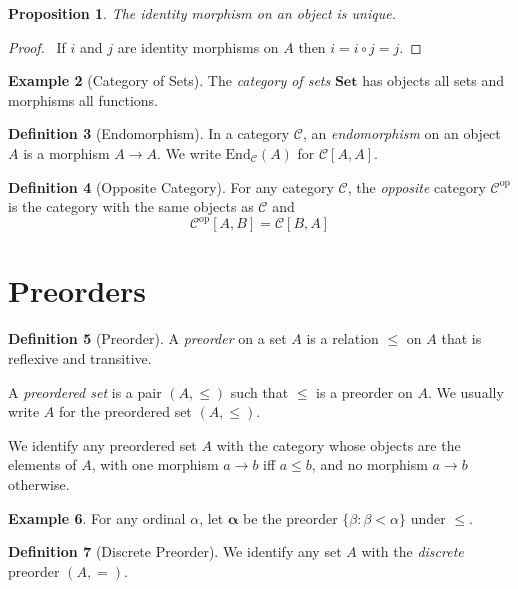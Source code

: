 \documentclass{book}
\let\qed\relax
\newtheorem{prop}{Proposition}[chapter]
\theoremstyle{definition}
\newtheorem{df}[prop]{Definition}
\newtheorem{ex}[prop]{Example}
\newcommand{\Set}{\ensuremath{\mathbf{Set}}}
\begin{document}
\begin{prop}
    \label{prop:id-morph-unique}
    The identity morphism on an object is unique.
\end{prop}

\begin{proof}
    \pf\ If $i$ and $j$ are identity morphisms on $A$ then $i = i \circ j = j$. \qed
\end{proof}

\begin{ex}[Category of Sets]
    The \emph{category of sets} $\Set$ has objects all sets and morphisms all functions.
\end{ex}

\begin{df}[Endomorphism]
    In a category $\mathcal{C}$, an \emph{endomorphism} on an object $A$ is a morphism $A \rightarrow A$. We write $\mathrm{End}_\mathcal{C}(A)$ for $\mathcal{C}[A,A]$.
\end{df}

\begin{df}[Opposite Category]
    For any category $\mathcal{C}$, the \emph{opposite} category $\mathcal{C}^\mathrm{op}$ is the category with the same objects as $\mathcal{C}$ and
    \[ \mathcal{C}^\mathrm{op}[A,B] = \mathcal{C}[B,A] \]
\end{df}

\section{Preorders}

\begin{df}[Preorder]
    A \emph{preorder} on a set $A$ is a relation $\leq$ on $A$ that is reflexive and transitive.

    A \emph{preordered set} is a pair $(A, \leq)$ such that $\leq$ is a preorder on
    $A$. We usually write $A$ for the preordered set $(A, \leq)$.

    We identify any preordered set $A$ with the category whose objects are the
    elements of $A$, with one morphism $a \rightarrow b$ iff $a \leq b$, and no
    morphism $a \rightarrow b$ otherwise.
\end{df}

\begin{ex}
    For any ordinal $\alpha$, let $\mathbf{\alpha}$ be the preorder $\{ \beta : \beta < \alpha \}$ under $\leq$.
\end{ex}

\begin{df}[Discrete Preorder]
    We identify any set $A$ with the \emph{discrete} preorder $(A, =)$.
\end{df}
\end{document}
